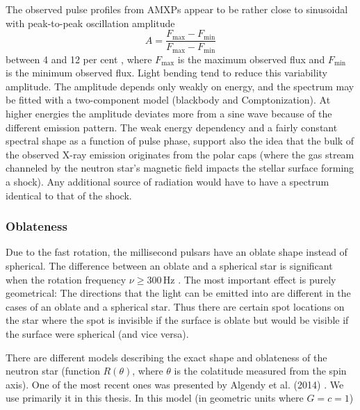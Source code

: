 \documentclass{wihuri}
\def\be{\begin{equation}}
\def\ee{\end{equation}}
\begin{document}
The observed pulse profiles from AMXPs appear to be rather close to sinusoidal with peak-to-peak oscillation amplitude 
\be \label{eq:amplitude}
A = \frac{F_{\mathrm{max}} - F_{\mathrm{min}}} {F_{\mathrm{max}} - F_{\mathrm{min}}}
\ee %
 between 4 and 12 per cent \cite{poutarew2006}, where $F_{\mathrm{max}}$ is the maximum observed flux and $F_{\mathrm{min}}$ is the minimum observed flux. Light bending tend %
to reduce this variability amplitude. The amplitude depends only weakly on energy, and the spectrum may be fitted with a two-component model (blackbody and Comptonization). At higher energies the amplitude deviates more from a sine wave because of the different emission pattern. The weak energy dependency and a fairly constant spectral shape as a function of pulse phase, support also the idea that the bulk of the observed X-ray emission originates from the polar caps (where the gas stream channeled by the neutron star's magnetic field impacts the stellar surface forming a shock). Any additional source of radiation would have to have a spectrum identical to that of the shock.


\subsubsection{Oblateness}

Due to the fast rotation, the millisecond pulsars have an oblate shape instead of spherical. The difference between an oblate and a spherical star is significant when the rotation frequency $\nu \ge 300 \, \mathrm{Hz}$ \cite{cadeau}%
. The most important effect is purely geometrical: The directions that the light can be emitted into are different in the cases of an oblate and a spherical star. Thus there are certain spot locations on the star where the spot is invisible if the surface is oblate but would be visible if the surface were spherical (and vice versa).


There are different models describing the exact shape and oblateness of the neutron star (function $R(\theta)$, where $\theta$ is the colatitude measured from the spin axis).
One of the most recent ones was presented by Algendy et al. (2014) \cite{algendy}. 
We use primarily it in this thesis. In this model (in geometric units
where $G = c = 1$)
\end{document}
